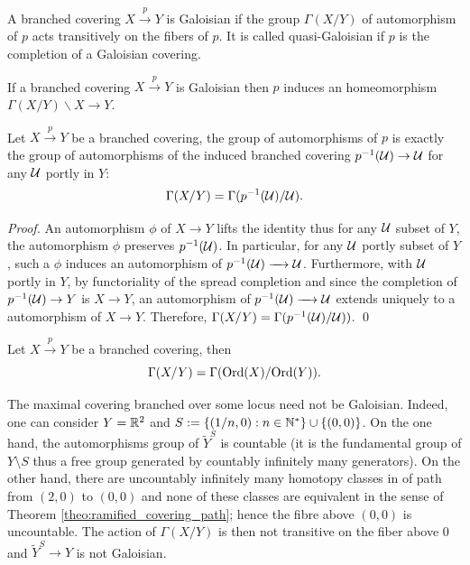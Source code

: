\begin{defi} A branched covering $X\xrightarrow{p} Y$ is Galoisian if the group $\Gamma(X/Y)$ of automorphism of $p$ acts transitively on the fibers of $p$. It is called quasi-Galoisian if $p$ is the completion of a Galoisian covering.  


\end{defi}

\begin{rem}\label{rem:galois_quotient} If a branched covering $X\xrightarrow{p} Y$ is Galoisian then $p$ induces an homeomorphism $\Gamma(X/Y)\backslash X \rightarrow Y$. 
\end{rem}


\begin{lem} Let $X\xrightarrow{p} Y$ be a branched covering, the group of automorphisms of $p$ is exactly the group of automorphisms of the induced branched covering $p^{-1}(\mathcal{U}) \rightarrow \mathcal{U}$ for any $\mathcal{U}$ portly in $Y$:
$$\Gamma(X/Y) = \Gamma(p^{-1}(\mathcal{U})/\mathcal{U}).$$
\end{lem}
\begin{proof}
 An automorphism $\phi$ of $X \rightarrow Y$ lifts the identity thus  for any $\mathcal{U}$ subset  of $Y$, the automorphism $\phi$ preserves $p^{-1}(\mathcal{U})$. In particular, for any $\mathcal{U}$ portly subset of $Y$, such a $\phi$ induces an automorphism of $p^{-1}(\mathcal{U}) \xrightarrow{~~~} \mathcal{U}$. Furthermore, with $\mathcal{U}$ portly in $Y$, by functoriality of the spread completion and since the completion of $p^{-1}(\mathcal{U})\rightarrow Y$ is $X\rightarrow Y$, an automorphism of $p^{-1}(\mathcal{U}) \xrightarrow{~~~} \mathcal{U}$ extends uniquely to a automorphism of $X \xrightarrow{~~~} Y$.   Therefore, $\Gamma(X/Y) = \Gamma(p^{-1}(\mathcal{U})/\mathcal{U}))$.
\qed\end{proof}
\begin{cor}Let $X\xrightarrow{p} Y$ be a branched covering, then
 $$\Gamma(X/Y) =  \Gamma(\mathrm{Ord}(X)/\mathrm{Ord}(Y)).$$
\end{cor}



The maximal covering branched over some locus need not be Galoisian. Indeed, one can consider $Y=\mathbb R^2$ and $S:=\{(1/n,0):n\in \mathbb{N}^*\}\cup \{(0,0)\}$. On the one hand, the automorphisms group of $\widetilde Y^S$ is countable (it is the fundamental group of $Y\setminus S$ thus a free group generated by countably infinitely many generators). On the other hand, there are uncountably infinitely many homotopy classes in of path from $(2,0)$ to $(0,0)$ and none of these classes are equivalent in the sense of Theorem \ref{theo:ramified_covering_path};
hence the fibre above $(0,0)$ is uncountable. The action of $\Gamma(X/Y)$ is then not transitive on the fiber above $0$ and $\widetilde Y^S \rightarrow Y$ is not Galoisian.


